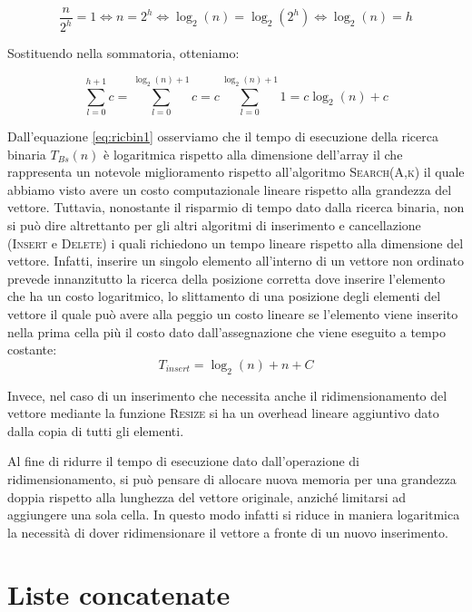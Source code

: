 \begin{equation}
\frac{n}{2^h} = 1 \iff n = 2^h \iff \log_2(n) = \log_2(2^h) \iff \log_2(n) = h
\end{equation}

Sostituendo nella sommatoria, otteniamo:

\begin{equation}\label{eq:ricbin1}
    \sum_{l=0}^{h+1} c = \sum_{l=0}^{\log_2(n)+1} c = c \sum_{l=0}^{\log_2(n)+1} 1 = c\log_2(n) + c
\end{equation}

Dall'equazione \ref{eq:ricbin1} osserviamo che il tempo di esecuzione della ricerca binaria $T_{Bs}(n)$ è logaritmica rispetto alla dimensione dell'array il che rappresenta un notevole miglioramento rispetto all'algoritmo \textsc{Search(A,k)} il quale abbiamo visto avere un costo computazionale lineare rispetto alla grandezza del vettore. Tuttavia, nonostante il risparmio di tempo dato dalla ricerca binaria, non si può dire altrettanto per gli altri algoritmi di inserimento e cancellazione (\textsc{Insert} e \textsc{Delete}) i quali richiedono un tempo lineare rispetto alla dimensione del vettore. Infatti, inserire un singolo elemento all'interno di un vettore non ordinato prevede innanzitutto la ricerca della posizione corretta dove inserire l'elemento che ha un costo logaritmico, lo slittamento di una posizione degli elementi del vettore il quale può avere alla peggio un costo lineare se l'elemento viene inserito nella prima cella più il costo dato dall'assegnazione che viene eseguito a tempo costante:
\[T_{insert} = \log_{2}(n)+n+C\]

Invece, nel caso di un inserimento che necessita anche il ridimensionamento del vettore mediante la funzione \textsc{Resize} si ha un overhead lineare aggiuntivo dato dalla copia di tutti gli elementi.

Al fine di ridurre il tempo di esecuzione dato dall'operazione di ridimensionamento, si può pensare di allocare nuova memoria per una grandezza doppia rispetto alla lunghezza del vettore originale, anziché limitarsi ad aggiungere una sola cella. In questo modo infatti si riduce in maniera logaritmica la necessità di dover ridimensionare il vettore a fronte di un nuovo inserimento.

\section{Liste concatenate}



